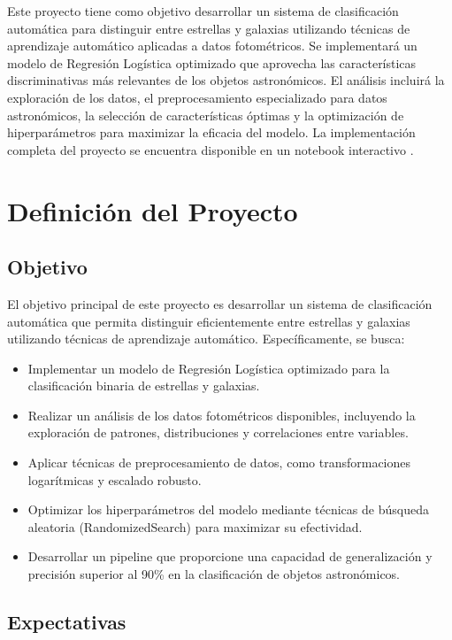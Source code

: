 \documentclass{article}
\begin{document}
Este proyecto tiene como objetivo desarrollar un sistema de clasificación automática para distinguir entre estrellas y galaxias utilizando técnicas de aprendizaje automático aplicadas a datos fotométricos. Se implementará un modelo de Regresión Logística optimizado que aprovecha las características discriminativas más relevantes de los objetos astronómicos. El análisis incluirá la exploración de los datos, el preprocesamiento especializado para datos astronómicos, la selección de características óptimas y la optimización de hiperparámetros para maximizar la eficacia del modelo. La implementación completa del proyecto se encuentra disponible en un notebook interactivo \cite{colab_notebook}.


\section{Definición del Proyecto}

\subsection{Objetivo}

El objetivo principal de este proyecto es desarrollar un sistema de clasificación automática que permita distinguir eficientemente entre estrellas y galaxias utilizando técnicas de aprendizaje automático. Específicamente, se busca:

\begin{itemize}
    \item Implementar un modelo de Regresión Logística optimizado para la clasificación binaria de estrellas y galaxias.
    \item Realizar un análisis de los datos fotométricos disponibles, incluyendo la exploración de patrones, distribuciones y correlaciones entre variables.
    \item Aplicar técnicas de preprocesamiento de datos, como transformaciones logarítmicas y escalado robusto.
    \item Optimizar los hiperparámetros del modelo mediante técnicas de búsqueda aleatoria (RandomizedSearch) para maximizar su efectividad.
    \item Desarrollar un pipeline que proporcione una capacidad de generalización y precisión superior al 90\% en la clasificación de objetos astronómicos.
\end{itemize}

\subsection{Expectativas}
\end{document}
